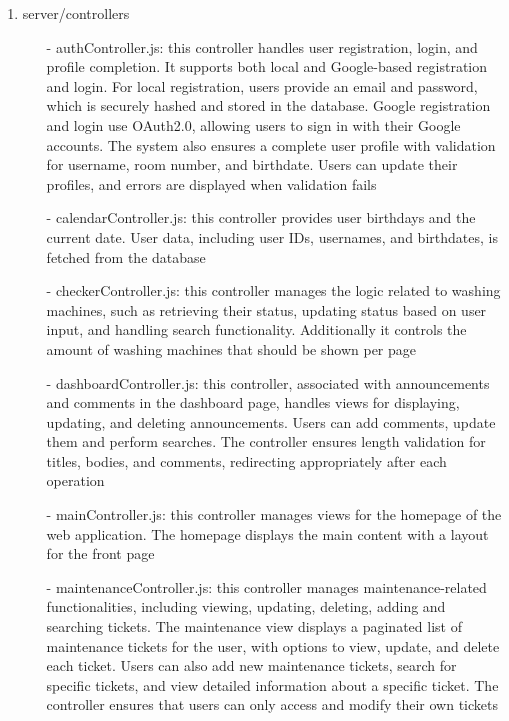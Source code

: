\documentclass[conference]{IEEEtran}
\begin{document}
\begin{enumerate}
\begin{enumerate}
\begin{itemize}
                \end{itemize}
            \item server/controllers
                \begin{itemize}
                    \item[-] authController.js: this controller handles user registration, login, and profile completion. It supports both local and Google-based registration and login. For local registration, users provide an email and password, which is securely hashed and stored in the database. Google registration and login use OAuth2.0, allowing users to sign in with their Google accounts. The system also ensures a complete user profile with validation for username, room number, and birthdate. Users can update their profiles, and errors are displayed when validation fails
                    \item[-] calendarController.js: this controller provides user birthdays and the current date. User data, including user IDs, usernames, and birthdates, is fetched from the database
                    \item[-] checkerController.js: this controller manages the logic related to washing machines, such as retrieving their status, updating status based on user input, and handling search functionality. Additionally it controls the amount of washing machines that should be shown per page
                    \item[-] dashboardController.js: this controller, associated with announcements and comments in the dashboard page, handles views for displaying, updating, and deleting announcements. Users can add comments, update them and perform searches. The controller ensures length validation for titles, bodies, and comments, redirecting appropriately after each operation
                    \item[-] mainController.js: this controller manages views for the homepage of the web application. The homepage displays the main content with a layout for the front page
                    \item[-] maintenanceController.js: this controller manages maintenance-related functionalities, including viewing, updating, deleting, adding and searching tickets. The maintenance view displays a paginated list of maintenance tickets for the user, with options to view, update, and delete each ticket. Users can also add new maintenance tickets, search for specific tickets, and view detailed information about a specific ticket. The controller ensures that users can only access and modify their own tickets

\end{itemize}
\end{enumerate}
\end{enumerate}
\end{document}
